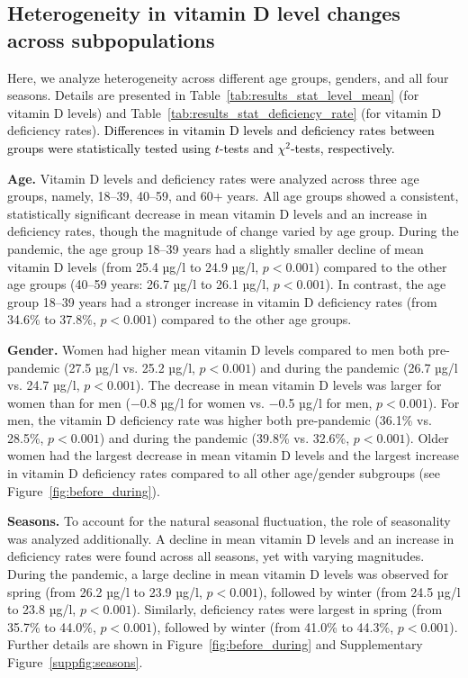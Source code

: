\documentclass[12pt]{article}
\newcommand{\REV}[1]{\textcolor{black}{#1}}
\begin{document}
\subsection*{Heterogeneity in vitamin D level changes across subpopulations}

Here, we analyze heterogeneity across different age groups, genders, and all four seasons. Details are presented in Table~\ref{tab:results_stat_level_mean} (for vitamin D levels) and Table~\ref{tab:results_stat_deficiency_rate} (for vitamin D deficiency rates). \REV{Differences in vitamin D levels and deficiency rates between groups were statistically tested using $t$-tests and $\chi^2$-tests, respectively.}

\textbf{Age.} Vitamin D levels and deficiency rates were analyzed across three age groups, namely, 18--39, 40--59, and 60+ years. All age groups showed a consistent, statistically significant decrease in mean vitamin D levels and an increase in deficiency rates, though the magnitude of change varied by age group. During the pandemic, the age group 18--39 years had a slightly smaller decline of mean vitamin D levels (from 25.4 µg/l to 24.9 µg/l, $p < 0.001$) compared to the other age groups (40--59 years: 26.7 µg/l to 26.1 µg/l, $p < 0.001$). In contrast, the age group 18--39 years had a stronger increase in vitamin D deficiency rates (from 34.6\% to 37.8\%, $p < 0.001$) compared to the other age groups. 

\textbf{Gender.} Women had higher mean vitamin D levels compared to men both pre-pandemic (27.5 µg/l vs. 25.2 µg/l, $p < 0.001$) and during the pandemic (26.7 µg/l vs. 24.7 µg/l, $p < 0.001$). The decrease in mean vitamin D levels was larger for women than for men ($-$0.8 µg/l for women vs. $-$0.5 µg/l for men, $p < 0.001$). For men, the vitamin D deficiency rate was higher both pre-pandemic (36.1\% vs. 28.5\%, $p < 0.001$) and during the pandemic (39.8\% vs. 32.6\%, $p < 0.001$). Older women had the largest decrease in mean vitamin D levels and the largest increase in vitamin D deficiency rates compared to all other age/gender subgroups (see Figure~\ref{fig:before_during}).

\textbf{Seasons.} To account for the natural seasonal fluctuation, the role of seasonality was analyzed additionally. A decline in mean vitamin D levels and an increase in deficiency rates were found across all seasons, yet with varying magnitudes. During the pandemic, a large decline in mean vitamin D levels was observed for spring (from 26.2 µg/l to 23.9 µg/l, $p < 0.001$), followed by winter (from 24.5 µg/l to 23.8 µg/l, $p < 0.001$). Similarly, deficiency rates were largest in spring (from 35.7\% to 44.0\%, $p < 0.001$), followed by winter (from 41.0\% to 44.3\%, $p < 0.001$). Further details are shown in Figure~\ref{fig:before_during} and Supplementary Figure~\ref{suppfig:seasons}.
\end{document}
